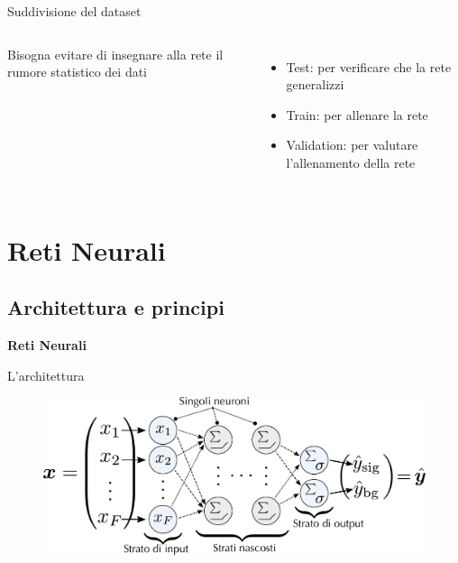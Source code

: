 \documentclass{beamer}
\begin{document}
\begin{frame}{Suddivisione del dataset}
\begin{columns}
      Bisogna evitare di insegnare alla rete il rumore statistico dei dati
      \begin{itemize}
        \item<2->Test: per verificare che la rete generalizzi
        \item<3->Train: per allenare la rete
        \item<3->Validation: per valutare l'allenamento della rete
      \end{itemize}


    \end{columns}
\end{frame}

\section{Reti Neurali}
\subsection{Architettura e principi}
\begin{frame}
  \centering
  \Huge\bfseries
  Reti Neurali
\end{frame}

\begin{frame}{L'architettura}
  \vspace*{4.5ex}
  \begin{figure}
    \includegraphics[width=\linewidth]{./Images/fcn-architecture-simple-flat.pdf}
  \end{figure}
  \begin{flushright}
    \vspace*{2.0ex}
  \end{flushright}
\end{frame}
\end{document}
